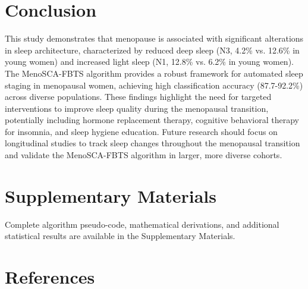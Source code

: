 \documentclass[ASNA,twocolumn]{USG}
\begin{document}
\section{Conclusion}\label{sec5}

This study demonstrates that menopause is associated with significant alterations in sleep architecture, characterized by reduced deep sleep (N3, 4.2\% vs. 12.6\% in young women) and increased light sleep (N1, 12.8\% vs. 6.2\% in young women). The MenoSCA-FBTS algorithm provides a robust framework for automated sleep staging in menopausal women, achieving high classification accuracy (87.7-92.2\%) across diverse populations. These findings highlight the need for targeted interventions to improve sleep quality during the menopausal transition, potentially including hormone replacement therapy, cognitive behavioral therapy for insomnia, and sleep hygiene education. Future research should focus on longitudinal studies to track sleep changes throughout the menopausal transition and validate the MenoSCA-FBTS algorithm in larger, more diverse cohorts.

\section*{Supplementary Materials}

Complete algorithm pseudo-code, mathematical derivations, and additional statistical results are available in the Supplementary Materials.

\section{References}\label{sec6}
\end{document}
